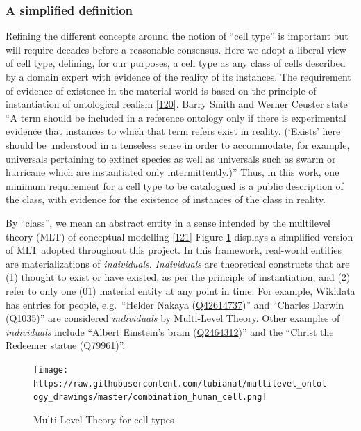 \hypertarget{a-simplified-definition}{%
\subsubsection{A simplified definition}\label{a-simplified-definition}}

Refining the different concepts around the notion of ``cell type'' is important but will require decades before a reasonable consensus. Here we adopt a liberal view of cell type, defining, for our purposes, a cell type as any class of cells described by a domain expert with evidence of the reality of its instances.
The requirement of evidence of existence in the material world is based on the principle of instantiation of ontological realism {[}\protect\hyperlink{ref-5ZFRyTy5}{120}{]}. Barry Smith and Werner Ceuster state ``A term should be included in a reference ontology only if there is experimental evidence that instances to which that term refers exist in reality. (`Exists' here should be understood in a tenseless sense in order to accommodate, for example, universals pertaining to extinct species as well as universals such as swarm or hurricane which are instantiated only intermittently.)''
Thus, in this work, one minimum requirement for a cell type to be catalogued is a public description of the class, with evidence for the existence of instances of the class in reality.

By ``class'', we mean an abstract entity in a sense intended by the multilevel theory (MLT) of conceptual modelling {[}\protect\hyperlink{ref-eP47FILn}{121}{]}
Figure \ref{fig:multilevel} displays a simplified version of MLT adopted throughout this project.
In this framework, real-world entities are materializations of \emph{individuals}.
\emph{Individuals} are theoretical constructs that are (1) thought to exist or have existed, as per the principle of instantiation, and (2) refer to only one (01) material entity at any point in time.
For example, Wikidata has entries for people, e.g.~``Helder Nakaya (\href{https://www.wikidata.org/wiki/Q42614737}{Q42614737})'' and ``Charles Darwin (\href{https://www.wikidata.org/wiki/Q42614737}{Q1035})'' are considered \emph{individuals} by Multi-Level Theory.
Other examples of \emph{individuals} include ``Albert Einstein's brain (\href{https://www.wikidata.org/wiki/Q2464312}{Q2464312})'' and the ``Christ the Redeemer statue (\href{https://www.wikidata.org/wiki/Q79961}{Q79961})''.

\begin{figure}
\hypertarget{fig:multilevel}{%
\centering
\texttt{[image: https://raw.githubusercontent.com/lubianat/multilevel\_ontology\_drawings/master/combination\_human\_cell.png]}
\caption{Multi-Level Theory for cell types}\label{fig:multilevel}
}
\end{figure}


